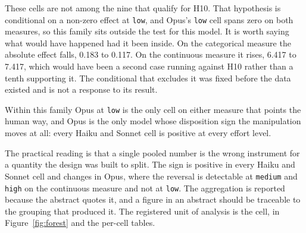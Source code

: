 These cells are not among the nine that qualify for H10. That hypothesis is
conditional on a non-zero effect at \texttt{low}, and Opus's \texttt{low}
cell spans zero on both measures, so this family sits outside the test for
this model. It is worth saying what would have happened had it been inside.
On the categorical measure the absolute effect falls, 0.183 to 0.117. On the
continuous measure it rises, 6.417 to 7.417, which would have been a second
case running against H10 rather than a tenth supporting it. The conditional
that excludes it was fixed before the data existed and is not a response to
its result.

Within this family Opus at \texttt{low} is the only cell on either measure
that points the human way, and Opus is the only model whose disposition sign
the manipulation moves at all: every Haiku and Sonnet cell is positive at
every effort level.

The practical reading is that a single pooled number is the wrong instrument
for a quantity the design was built to split. The sign is positive in every
Haiku and Sonnet cell and changes in Opus, where the reversal is detectable
at \texttt{medium} and \texttt{high} on the continuous measure and not at
\texttt{low}. The aggregation is reported because the abstract quotes it,
and a figure in an abstract should be traceable to the grouping that
produced it. The registered unit of analysis is the cell, in
Figure~\ref{fig:forest} and the per-cell tables.

